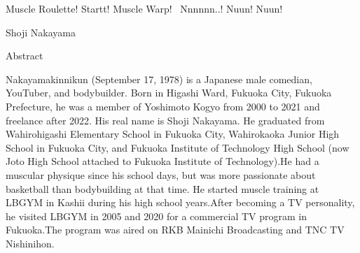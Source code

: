 \pagestyle{empty}

\begin{center}
    Muscle Roulette! Startt! Muscle Warp! ~Nnnnnn..! Nuun! Nuun!
\end{center}
\vspace{10mm}
\begin{center}
    Shoji Nakayama
\end{center}
\vspace{10mm}

\begin{center}
    Abstract
\end{center}
\vspace{10mm}

Nakayamakinnikun (September 17, 1978) is a Japanese male comedian, YouTuber, and bodybuilder. 
Born in Higashi Ward, Fukuoka City, Fukuoka Prefecture, he was a member of Yoshimoto Kogyo from 2000 to 2021 and freelance after 2022.
His real name is Shoji Nakayama.
He graduated from Wahirohigashi Elementary School in Fukuoka City, Wahirokaoka Junior High School in Fukuoka City, and Fukuoka Institute of Technology High School (now Joto High School attached to Fukuoka Institute of Technology).He had a muscular physique since his school days, but was more passionate about basketball than bodybuilding at that time.
He started muscle training at LBGYM in Kashii during his high school years.After becoming a TV personality, he visited LBGYM in 2005 and 2020 for a commercial TV program in Fukuoka.The program was aired on RKB Mainichi Broadcasting and TNC TV Nishinihon.
